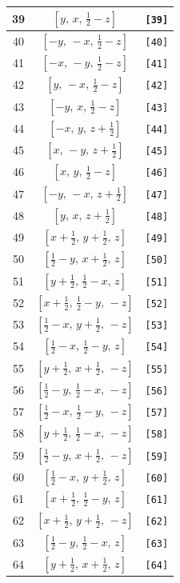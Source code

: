 \documentclass[fleqn,8pt]{jsarticle}
\begin{document}
\begin{longtable}{ccc}
39 & $\left[ y,\, x,\, \frac{1}{2} - z \right]$ & {\tt [39]} \\ \hline
40 & $\left[ - y,\, - x,\, \frac{1}{2} - z \right]$ & {\tt [40]} \\ \hline
41 & $\left[ - x,\, - y,\, \frac{1}{2} - z \right]$ & {\tt [41]} \\ \hline
42 & $\left[ y,\, - x,\, \frac{1}{2} - z \right]$ & {\tt [42]} \\ \hline
43 & $\left[ - y,\, x,\, \frac{1}{2} - z \right]$ & {\tt [43]} \\ \hline
44 & $\left[ - x,\, y,\, z + \frac{1}{2} \right]$ & {\tt [44]} \\ \hline
45 & $\left[ x,\, - y,\, z + \frac{1}{2} \right]$ & {\tt [45]} \\ \hline
46 & $\left[ x,\, y,\, \frac{1}{2} - z \right]$ & {\tt [46]} \\ \hline
47 & $\left[ - y,\, - x,\, z + \frac{1}{2} \right]$ & {\tt [47]} \\ \hline
48 & $\left[ y,\, x,\, z + \frac{1}{2} \right]$ & {\tt [48]} \\ \hline
49 & $\left[ x + \frac{1}{2},\, y + \frac{1}{2},\, z \right]$ & {\tt [49]} \\ \hline
50 & $\left[ \frac{1}{2} - y,\, x + \frac{1}{2},\, z \right]$ & {\tt [50]} \\ \hline
51 & $\left[ y + \frac{1}{2},\, \frac{1}{2} - x,\, z \right]$ & {\tt [51]} \\ \hline
52 & $\left[ x + \frac{1}{2},\, \frac{1}{2} - y,\, - z \right]$ & {\tt [52]} \\ \hline
53 & $\left[ \frac{1}{2} - x,\, y + \frac{1}{2},\, - z \right]$ & {\tt [53]} \\ \hline
54 & $\left[ \frac{1}{2} - x,\, \frac{1}{2} - y,\, z \right]$ & {\tt [54]} \\ \hline
55 & $\left[ y + \frac{1}{2},\, x + \frac{1}{2},\, - z \right]$ & {\tt [55]} \\ \hline
56 & $\left[ \frac{1}{2} - y,\, \frac{1}{2} - x,\, - z \right]$ & {\tt [56]} \\ \hline
57 & $\left[ \frac{1}{2} - x,\, \frac{1}{2} - y,\, - z \right]$ & {\tt [57]} \\ \hline
58 & $\left[ y + \frac{1}{2},\, \frac{1}{2} - x,\, - z \right]$ & {\tt [58]} \\ \hline
59 & $\left[ \frac{1}{2} - y,\, x + \frac{1}{2},\, - z \right]$ & {\tt [59]} \\ \hline
60 & $\left[ \frac{1}{2} - x,\, y + \frac{1}{2},\, z \right]$ & {\tt [60]} \\ \hline
61 & $\left[ x + \frac{1}{2},\, \frac{1}{2} - y,\, z \right]$ & {\tt [61]} \\ \hline
62 & $\left[ x + \frac{1}{2},\, y + \frac{1}{2},\, - z \right]$ & {\tt [62]} \\ \hline
63 & $\left[ \frac{1}{2} - y,\, \frac{1}{2} - x,\, z \right]$ & {\tt [63]} \\ \hline
64 & $\left[ y + \frac{1}{2},\, x + \frac{1}{2},\, z \right]$ & {\tt [64]} \\
\end{longtable}
\end{document}
